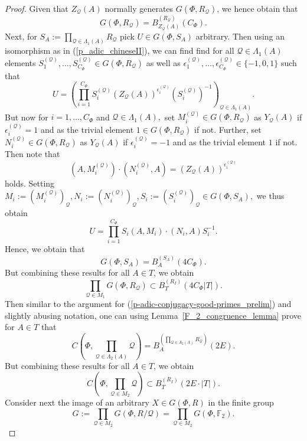 \documentclass[12pt]{amsart}
\newcommand{\C}[1]{{\mathcal #1}}
\theoremstyle{definition}\newtheorem{definition}[theorem]{Definition}
\theoremstyle{remark}\newtheorem{remark}[theorem]{Remark}
\theoremstyle{definition}\newtheorem{case}{Case}
\begin{document}
\begin{proof}
Given that $Z_{\C Q}(A)$ normally generates $G(\Phi,R_{\C Q})$, we hence obtain that 
\[
G(\Phi,R_{\C Q})=B_{Z_{\C Q}(A)}^{(R_{\C Q})}(C_{\Phi}).
\]
Next, for $S_A:=\prod_{\C Q\in\Lambda_1(A)}R_{\C Q}$ pick $U\in G(\Phi,S_A)$ arbitrary. Then using an isomorphism as in (\ref{p_adic_chineseII}), we can find find for all $\C Q\in\Lambda_1(A)$ elements $S^{(\C Q)}_1,\dots,S^{(\C Q)}_{C_{\Phi}}\in G(\Phi,R_{\C Q})$ as well as $\epsilon_1^{(\C Q)},\dots,\epsilon_{C_{\Phi}}^{(\C Q)}\in\{-1,0,1\}$ such that 
\[
U=\left(\prod_{i=1}^{C_{\Phi}} S_i^{(\C Q)} (Z_{\C Q}(A))^{\epsilon_i^{(\C Q)}} (S_i^{(\C Q)})^{-1}\right)_{\C Q\in\Lambda_1(A)}.
\]
But now for $i=1,\dots,C_{\Phi}$ and $\C Q\in\Lambda_1(A),$ set $M_i^{(\C Q)}\in G(\Phi,R_{\C Q})$ as $Y_{\C Q}(A)$ if $\epsilon_i^{(\C Q)}=1$ and as the trivial element $1\in G(\Phi,R_{\C Q})$ if not. Further, set $N_i^{(\C Q)}\in G(\Phi,R_{\C Q})$ as $Y_{\C Q}(A)$ if $\epsilon_i^{(\C Q)}=-1$ and as the trivial element $1$ if not. Then note that 
\[
\left(A,M_i^{(\C Q)}\right)\cdot\left(N_i^{(\C Q)},A\right)=(Z_{\C Q}(A))^{\epsilon_i^{(\C Q)}}
\]
holds. Setting $M_i:=\left(M_i^{(\C Q)}\right)_{\C Q}, N_i:=\left(N_i^{(\C Q)}\right)_{\C Q},S_i:=\left(S_i^{(\C Q)}\right)_{\C Q}\in G(\Phi,S_A),$ we thus obtain
\[
U=\prod_{i=1}^{C_{\Phi}} S_i \left(A,M_i\right)\cdot\left(N_i,A\right) S_i^{-1}.
\]
Hence, we obtain that 
\begin{equation}\label{p-adic-conjugacy-good-primes_prelim}
G(\Phi,S_A)=B_A^{(S_A)}(4C_{\Phi}).
\end{equation}
But combining these results for all $A\in T$, we obtain 
\begin{equation}\label{p-adic-conjugacy-good-primes}
\prod_{\C Q\in M_1}G(\Phi,R_{\C Q})\subset B_T^{(R_I)}(4C_{\Phi}|T|).
\end{equation}
Then similar to the argument for (\ref{p-adic-conjugacy-good-primes_prelim}) and slightly abusing notation, one can using Lemma~\ref{F_2_congruence_lemma} prove for $A\in T$ that 
\begin{equation}\label{p-adic-conjugacy-bad-primes-congruence_prelim}
C\left(\Phi,\prod_{\C Q\in\Lambda_2(A)}\C Q\right)=B_A^{(\prod_{\C Q\in\Lambda_2(A)}R_{\C Q})}(2E).
\end{equation}
But combining these results for all $A\in T$, we obtain 
\begin{equation}\label{p-adic-conjugacy-bad-primes-congruence}
C\left(\Phi,\prod_{\C Q\in M_2} \C Q\right)\subset B_T^{(R_I)}(2E\cdot|T|).
\end{equation}
Consider next the image of an arbitrary $X\in G(\Phi,R)$ in the finite group 
\[
G:=\prod_{\C Q\in M_2}G(\Phi,R/\C Q)=\prod_{\C Q\in M_2}G(\Phi,\mathbb{F}_2).
\]






\end{proof}
\end{document}
